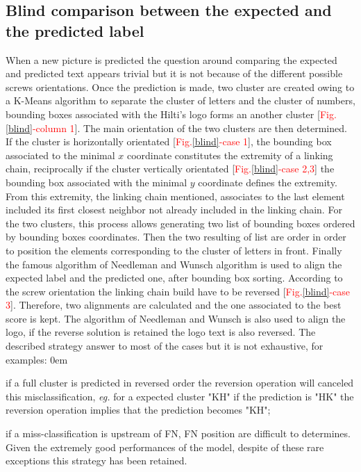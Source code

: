 \documentclass[12pt, french, a4paper]{article} %
\let\tempone\itemize
\let\temptwo\enditemize
\renewenvironment{itemize}{\tempone\addtolength{\itemsep}{-0.3\baselineskip}}{\temptwo}
\begin{document}
\subsection{Blind comparison between the expected and the predicted label}
When a new picture is predicted the question around comparing the expected and predicted text appears trivial but it is not because of the different possible screws orientations. Once the prediction is made, two cluster are created owing to a K-Means algorithm to separate the cluster of letters and the cluster of numbers, bounding boxes associated with the Hilti's logo forms an another cluster [\textcolor{red}{Fig.}\ref{blind}\textcolor{red}{-column 1}]. The main orientation of the two clusters are then determined. If the cluster is horizontally orientated [\textcolor{red}{Fig.}\ref{blind}\textcolor{red}{-case 1}], the bounding box associated to the minimal $x$ coordinate constitutes the extremity of a linking chain, reciprocally if the cluster vertically orientated [\textcolor{red}{Fig.}\ref{blind}\textcolor{red}{-case 2,3}] the bounding box associated with the minimal $y$ coordinate defines the extremity. From this extremity, the linking chain mentioned, associates to the last element included its first closest neighbor not already included in the linking chain. For the two clusters, this process allows generating two list of bounding boxes ordered by bounding boxes coordinates. Then the two resulting of list are order in order to position the elements corresponding to the cluster of letters in front. Finally the famous algorithm of Needleman and Wunsch algorithm \cite{spr1970general} is used to align the expected label and the predicted one, after bounding box sorting. According to the screw orientation the linking chain build have to be reversed [\textcolor{red}{Fig.}\ref{blind}\textcolor{red}{-case 3}]. Therefore, two alignments are calculated and the one associated to the best score is kept. The algorithm of Needleman and Wunsch is also used to align the logo, if the reverse solution is retained the logo text is also reversed. The described strategy answer to most of the cases but it is not exhaustive, for examples: 
\begin{itemize}
\itemsep0em 
 \item if a full cluster is predicted in reversed order the reversion operation will canceled this misclassification, \textit{eg.} for a expected cluster "KH" if the prediction is "HK" the reversion operation implies that the prediction becomes "KH";
 \item if a miss-classification is upstream of \gls{FN}, \gls{FN} position are difficult to determines. 
\end{itemize} 
Given the extremely good performances of the model, despite of these rare exceptions this strategy has been retained.
\end{document}
